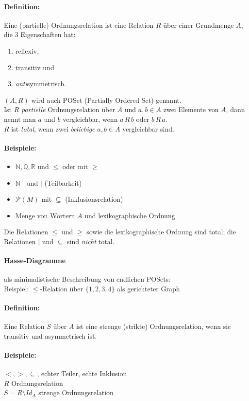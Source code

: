 \paragraph{Definition:}Eine (partielle) Ordnungsrelation ist eine Relation $R$ über einer Grundmenge $A$, die $3$ Eigenschaften hat:
\begin{enumerate}
\item reflexiv,
\item transitiv und
\item \emph{anti}symmetrisch.
\end{enumerate}
$(A,R)$ wird auch POSet (Partially Ordered Set) genannt.\\
Ist $R$ \emph{partielle} Ordnungsrelation über $A$ und $a,b \in A$ zwei Elemente von $A$, dann nennt man $a$ und $b$ vergleichbar, wenn $a\, R\, b$ oder $b\, R\, a$.\\
$R$ ist \emph{total}, wenn zwei \emph{beliebige} $a,b\in A$ vergleichbar sind.

\paragraph{Beispiele:}
\begin{itemize}
\item $\mathbb{N,Q,R}$ und $\leq$ oder mit $\geq$
\item $\mathbb{N}^+$ und $|$ (Teilbarkeit)
\item $\mathcal{P}(M)$ mit $\subseteq$ (Inklusionsrelation)
\item Menge von Wörtern $A$ und lexikographische Ordnung
\end{itemize}
Die Relationen $\leq$ und $\geq$ sowie die lexikographische Ordnung sind total; die Relationen $|$ und $\subseteq$ sind \emph{nicht} total.

\paragraph{Hasse-Diagramme}als minimalistische Beschreibung von endlichen POSets:\\
Beispiel: $\leq$-Relation über $\{1,2,3,4\}$ als gerichteter Graph

\paragraph{Definition:} Eine Relation $S$ über $A$ ist eine strenge (strikte) Ordnungsrelation, wenn sie transitiv und asymmetrisch ist.

\paragraph{Beispiele:}$<,>,\subseteq$, \glqq echter Teiler\grqq , \glqq echte Inklusion\grqq
\ \\
$R$ Ordnungsrelation\\
$S=R\setminus Id_A$ strenge Ordnungsrelation

%